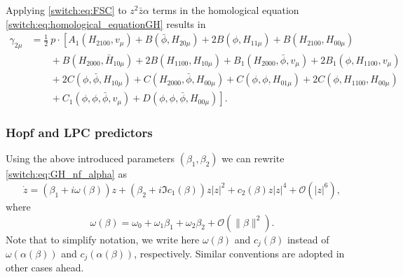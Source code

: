 Applying \cref{switch:eq:FSC} to $z^2\bar{z}\alpha$ terms in the homological equation \cref{switch:eq:homological_equationGH} results in
\begin{align*}
\gamma_{2\mu} & =\frac{1}{2}~p\cdot \left[A_{1}\left(H_{2100},v_{\mu}\right)+B\left(\bar{\phi},H_{20\mu}\right)+2B\left(\phi,H_{11\mu}\right)+B\left(H_{2100},H_{00\mu}\right) \right.\\
 & \qquad+B\left(H_{2000},\bar H_{10\mu}\right)+2B\left(H_{1100},H_{10\mu}\right)+B_1\left(H_{2000},\bar{\phi},v_{\mu}\right)+2B_1\left(\phi,H_{1100},v_{\mu}\right)\\
 & \qquad+2C\left(\phi,\bar{\phi},H_{10\mu}\right)+C\left(H_{2000},\bar{\phi},H_{00\mu}\right)+C\left(\phi,\phi,H_{01\mu}\right)+2C\left(\phi,H_{1100},H_{00\mu}\right)\\
 & \qquad+\left. C_{1}\left(\phi,\phi,\bar{\phi},v_{\mu}\right)+D\left(\phi,\phi,\bar{\phi},H_{00\mu}\right)\right].
\end{align*}

\subsubsection{Hopf and LPC predictors} \label{switch:sec:genh_predictors}
Using the above introduced parameters $(\beta_{1},\beta_{2})$ we can rewrite \cref{switch:eq:GH_nf_alpha} as
\[
\dot{z}=(\beta_{1}+i\omega(\beta))z+(\beta_{2}+i \Im c_1(\beta))z|z|^{2}+c_{2}(\beta)z|z|^{4}+\mathcal{O}(|z|^{6}),
\]
where 
\begin{equation}
\label{switch:Eq:omega_expansion}
\omega(\beta)=\omega_{0}+\omega_1\beta_1+\omega_2\beta_2+{\mathcal O}(\|\beta\|^2). 
\end{equation}
Note that to simplify notation, we write here $\omega(\beta)$ and $c_j(\beta)$ instead of $\omega(\alpha(\beta))$ and $c_j(\alpha(\beta))$, respectively. Similar conventions are adopted in other cases ahead. 

